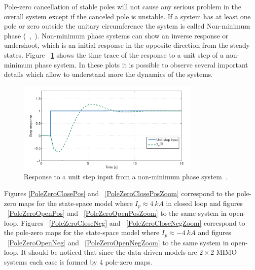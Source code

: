 Pole-zero cancellation of stable poles will not cause any serious problem in the overall system except if the canceled pole is unstable. If a system has at least one pole or zero outside the unitary circumference the system is called Non-minimum phase (~\cite[Chapter~6]{Ogata2009},~\cite[Chapter~2]{Golnaraghi2010}). Non-minimum phase systems can show an inverse response or undershoot, which is an initial response in the opposite direction from the steady states. Figure ~\ref{nonmin} shows the time trace of the response to a unit step of a non-minimum phase system. 
In these plots it is possible to observe several important details which allow to understand more the dynamics of the systems. 

\begin{figure}[h]
	\centering
	\includegraphics[width=0.8\textwidth]{Chp5/nonminimum_edit.png}
	\caption{Response to a unit step input from a non-minimum phase system~\cite{Uren2011}.\label{nonmin}}
\end{figure} \smallskip

Figures \ref{PoleZeroClosePos} and ~\ref{PoleZeroClosePosZoom} correspond to the pole-zero maps for the state-space model where $I_p\approx 4~kA$ in closed loop and figures ~\ref{PoleZeroOpenPos} and ~\ref{PoleZeroOpenPosZoom} to the same system in open-loop. Figures ~\ref{PoleZeroCloseNeg} and ~\ref{PoleZeroCloseNegZoom} correspond to the pole-zero maps for the state-space model where $I_p\approx -4~kA$ and figures ~\ref{PoleZeroOpenNeg} and ~\ref{PoleZeroOpenNegZoom} to the same system in open-loop. It should be noticed that since the data-driven models are $2\times2$ MIMO systems each case is formed by 4 pole-zero maps.\smallskip
 


